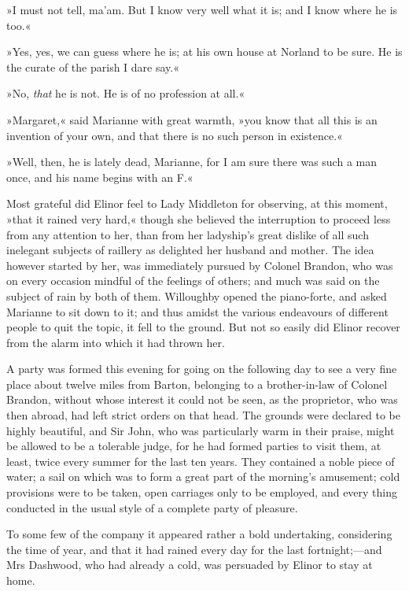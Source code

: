 »I must not tell, ma’am. But I know very well what it is; and I know where he is too.«

»Yes, yes, we can guess where he is; at his own house at Norland to be sure. He is the curate of the parish I dare say.«

»No, \textit{that} he is not. He is of no profession at all.«

»Margaret,« said Marianne with great warmth, »you know that all this is an invention of your own, and that there is no such person in existence.«

»Well, then, he is lately dead, Marianne, for I am sure there was such a man once, and his name begins with an F.«

Most grateful did Elinor feel to Lady Middleton for observing, at this moment, »that it rained very hard,« though she believed the interruption to proceed less from any attention to her, than from her ladyship’s great dislike of all such inelegant subjects of raillery as delighted her husband and mother. The idea however started by her, was immediately pursued by Colonel Brandon, who was on every occasion mindful of the feelings of others; and much was said on the subject of rain by both of them. Willoughby opened the piano-forte, and asked Marianne to sit down to it; and thus amidst the various endeavours of different people to quit the topic, it fell to the ground. But not so easily did Elinor recover from the alarm into which it had thrown her.

A party was formed this evening for going on the following day to see a very fine place about twelve miles from Barton, belonging to a brother-in-law of Colonel Brandon, without whose interest it could not be seen, as the proprietor, who was then abroad, had left strict orders on that head. The grounds were declared to be highly beautiful, and Sir John, who was particularly warm in their praise, might be allowed to be a tolerable judge, for he had formed parties to visit them, at least, twice every summer for the last ten years. They contained a noble piece of water; a sail on which was to form a great part of the morning’s amusement; cold provisions were to be taken, open carriages only to be employed, and every thing conducted in the usual style of a complete party of pleasure.

To some few of the company it appeared rather a bold undertaking, considering the time of year, and that it had rained every day for the last fortnight;—and Mrs Dashwood, who had already a cold, was persuaded by Elinor to stay at home.

\begin{a4}
	\enlargethispage{\baselineskip}
\end{a4}